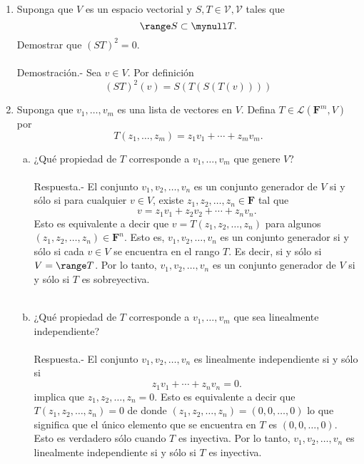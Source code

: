 \begin{enumerate}[\bfseries 1.]
    \item Suponga que $V$ es un espacio vectorial y $S,T\in \mathcal{V,V}$ tales que
    $$\range S\subset \mynull T.$$
    Demostrar que $(ST)^2=0.$\\\\
	Demostración.-\; Sea $v\in V$. Por definición 
	$$(ST)^2(v)=S\left(T(S(T(v)))\right)$$

    \item Suponga que $v_1,\ldots,v_m$ es una lista de vectores en $V$. Defina $T\in \mathcal{L}\left(\textbf{F}^m,V\right)$ por
    $$T(z_1,\ldots,z_m)=z_1v_1+\cdots+z_mv_m.$$
	
    \begin{enumerate}[(a)]

	\item ¿Qué propiedad de $T$ corresponde a $v_1,\ldots,v_m$ que genere $V$?\\\\
	    Respuesta.-\; El conjunto $v_1,v_2,\ldots,v_n$ es un conjunto generador de $V$ si y sólo si para cualquier $v\in V$, existe $z_1,z_2,\ldots,z_n\in \textbf{F}$ tal que 
	    $$v=z_1v_1+z_2v_2+\cdots+z_nv_n.$$
	    Esto es equivalente a decir que $v=T(z_1,z_2,\ldots,z_n)$ para algunos $(z_1,z_2,\ldots,z_n)\in \textbf{F}^n$. Esto es, $v_1,v_2,\ldots,v_n$ es un conjunto generador si y sólo si cada $v\in V$ se encuentra en el rango $T$. Es decir, si y sólo si $V=\range T$. Por lo tanto, $v_1,v_2,\ldots,v_n$ es un conjunto generador de $V$ si y sólo si $T$ es sobreyectiva.\\\\

	\item ¿Qué propiedad de $T$ corresponde a $v_1,\ldots,v_m$ que sea linealmente independiente?\\\\
	    Respuesta.-\; El conjunto $v_1,v_2,\ldots,v_n$ es linealmente independiente si y sólo si
	    $$z_1v_1+\cdots+z_nv_n = 0.$$
	    implica que $z_1,z_2,\ldots,z_n=0.$
	    Esto es equivalente a decir que $T(z_1,z_2,\ldots,z_n)=0$ de donde $(z_1,z_2,\ldots,z_n)=(0,0,\ldots,0)$ lo que significa  que el único elemento que se encuentra en $T$ es $(0,0,\ldots,0).$ Esto es verdadero sólo cuando $T$ es inyectiva. Por lo tanto, $v_1,v_2,\ldots,v_n$ es linealmente independiente si y sólo si $T$ es inyectiva.\\\\


\end{enumerate}
\end{enumerate}
